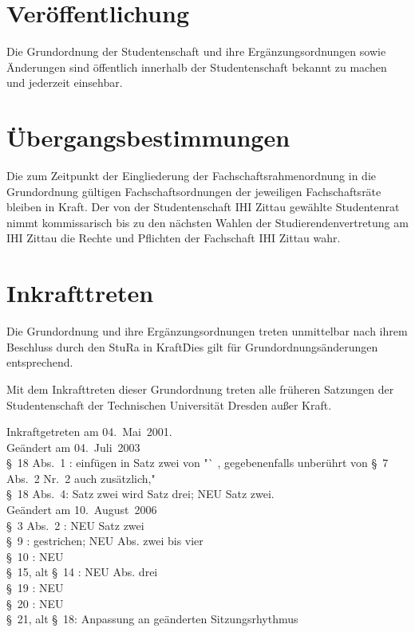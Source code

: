 \begin{multicols}{2}
\section{Veröffentlichung}

\Abs \Satz Die Grundordnung der Studentenschaft und ihre Ergänzungsordnungen sowie Änderungen sind öffentlich innerhalb der Studentenschaft bekannt zu machen und jederzeit einsehbar.



\section{Übergangsbestimmungen}

\Abs \Satz Die zum Zeitpunkt der Eingliederung der Fachschaftsrahmenordnung in die Grundordnung gültigen Fachschaftsordnungen der jeweiligen Fachschaftsräte bleiben in Kraft.
\Abs \Satz Der von der Studentenschaft IHI Zittau gewählte Studentenrat nimmt kommissarisch bis zu den nächsten Wahlen der Studierendenvertretung am IHI Zittau die Rechte und Pflichten der Fachschaft IHI Zittau wahr.


\section{Inkrafttreten}

\Abs \Satz Die Grundordnung und ihre Ergänzungsordnungen treten unmittelbar nach ihrem Beschluss durch den StuRa in Kraft\. Dies gilt für Grundordnungsänderungen entsprechend.

\Abs \Satz Mit dem Inkrafttreten dieser Grundordnung treten alle früheren Satzungen der Studentenschaft der Technischen Universität Dresden außer Kraft.

\end{multicols}

\nopagebreak
\vspace{1cm}
Inkraftgetreten am 04.~Mai~2001.
\\ 
  

\footnotesize
Geändert am 04.~Juli~2003\\
§~18 Abs.~1 : einfügen in Satz zwei von "` , gegebenenfalls unberührt von §~7 Abs.~2 Nr.~2 auch zusätzlich,"\\
§~18 Abs.~4: Satz zwei wird Satz drei; NEU Satz zwei.\\

Geändert am 10.~August~2006\\
§~3 Abs.~2 : NEU Satz zwei\\
§~9 : gestrichen;  NEU Abs. zwei bis vier\\
§~10 : NEU\\
§~15, alt \S~14 : NEU Abs. drei\\
§~19 : NEU\\
§~20 : NEU\\
§~21, alt §~18: Anpassung an geänderten Sitzungsrhythmus

